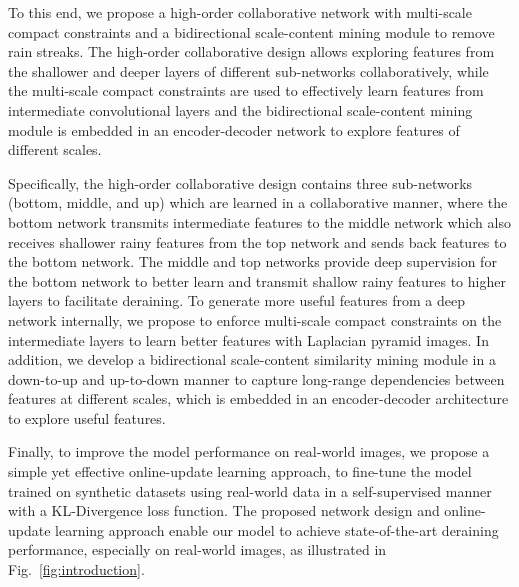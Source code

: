 \documentclass[letterpaper]{article} %
\begin{document}
To this end, we propose a high-order collaborative network with multi-scale compact constraints and a bidirectional scale-content mining module to remove rain streaks.
The high-order collaborative design allows exploring features from the shallower and deeper layers of different sub-networks collaboratively, while the multi-scale compact constraints are used to effectively learn features from intermediate convolutional layers and the bidirectional scale-content mining module is embedded in an encoder-decoder network to explore features of different scales.

Specifically, the high-order collaborative design contains three sub-networks (bottom, middle, and up) which are learned in a collaborative manner, where the bottom network transmits intermediate features to the middle network which also receives shallower rainy features from the top network and sends back features to the bottom network. The middle and top networks provide deep supervision for the bottom network to better learn and transmit shallow rainy features to higher layers to facilitate deraining. To generate more useful features from a deep network internally, we propose to enforce multi-scale compact constraints on the intermediate layers to learn better features with Laplacian pyramid images.
%
In addition, we develop a bidirectional scale-content similarity mining module in a down-to-up and up-to-down manner to capture long-range dependencies between features at different scales, which is embedded in an encoder-decoder architecture to explore useful features.
%

Finally, to improve the model performance on real-world images, we propose a simple yet effective online-update learning approach, to fine-tune the model trained on synthetic datasets using real-world data in a self-supervised manner with a KL-Divergence loss function. The proposed network design and online-update learning approach enable our model to achieve state-of-the-art deraining performance, especially on real-world images, as illustrated in Fig.~\ref{fig:introduction}.
\end{document}
